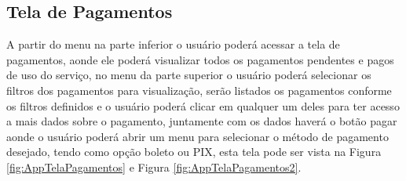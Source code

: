\documentclass[
    12pt,                   %
    openright,              %
    oneside,                %
    a4paper,                %
    sumario=tradicional,    %
    english,                %
    brazil,                 %
    ]{abntex2}
\begin{document}
        \subsection{Tela de Pagamentos}
            A partir do menu na parte inferior o usuário poderá acessar a tela de pagamentos, aonde ele poderá visualizar todos os pagamentos pendentes e pagos de uso do serviço, no menu da parte superior o usuário poderá selecionar os filtros dos pagamentos para visualização, serão listados os pagamentos conforme os filtros definidos e o usuário poderá clicar em qualquer um deles para ter acesso a mais dados sobre o pagamento, juntamente com os dados haverá o botão pagar aonde o usuário poderá abrir um menu para selecionar o método de pagamento desejado, tendo como opção boleto ou PIX,  esta tela pode ser vista na Figura \ref{fig:AppTelaPagamentos} e Figura \ref{fig:AppTelaPagamentos2}.
\end{document}
